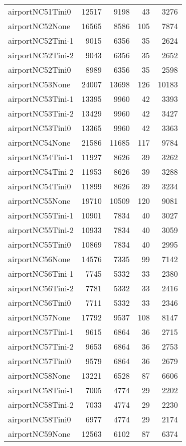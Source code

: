 \begin{longtable}{lrrrr}
airportNC51Tini0 & 12517 & 9198 & 43 & 3276 \\
airportNC52None & 16565 & 8586 & 105 & 7874 \\
airportNC52Tini-1 & 9015 & 6356 & 35 & 2624 \\
airportNC52Tini-2 & 9043 & 6356 & 35 & 2652 \\
airportNC52Tini0 & 8989 & 6356 & 35 & 2598 \\
airportNC53None & 24007 & 13698 & 126 & 10183 \\
airportNC53Tini-1 & 13395 & 9960 & 42 & 3393 \\
airportNC53Tini-2 & 13429 & 9960 & 42 & 3427 \\
airportNC53Tini0 & 13365 & 9960 & 42 & 3363 \\
airportNC54None & 21586 & 11685 & 117 & 9784 \\
airportNC54Tini-1 & 11927 & 8626 & 39 & 3262 \\
airportNC54Tini-2 & 11953 & 8626 & 39 & 3288 \\
airportNC54Tini0 & 11899 & 8626 & 39 & 3234 \\
airportNC55None & 19710 & 10509 & 120 & 9081 \\
airportNC55Tini-1 & 10901 & 7834 & 40 & 3027 \\
airportNC55Tini-2 & 10933 & 7834 & 40 & 3059 \\
airportNC55Tini0 & 10869 & 7834 & 40 & 2995 \\
airportNC56None & 14576 & 7335 & 99 & 7142 \\
airportNC56Tini-1 & 7745 & 5332 & 33 & 2380 \\
airportNC56Tini-2 & 7781 & 5332 & 33 & 2416 \\
airportNC56Tini0 & 7711 & 5332 & 33 & 2346 \\
airportNC57None & 17792 & 9537 & 108 & 8147 \\
airportNC57Tini-1 & 9615 & 6864 & 36 & 2715 \\
airportNC57Tini-2 & 9653 & 6864 & 36 & 2753 \\
airportNC57Tini0 & 9579 & 6864 & 36 & 2679 \\
airportNC58None & 13221 & 6528 & 87 & 6606 \\
airportNC58Tini-1 & 7005 & 4774 & 29 & 2202 \\
airportNC58Tini-2 & 7033 & 4774 & 29 & 2230 \\
airportNC58Tini0 & 6977 & 4774 & 29 & 2174 \\
airportNC59None & 12563 & 6102 & 87 & 6374 \\

\end{longtable}
